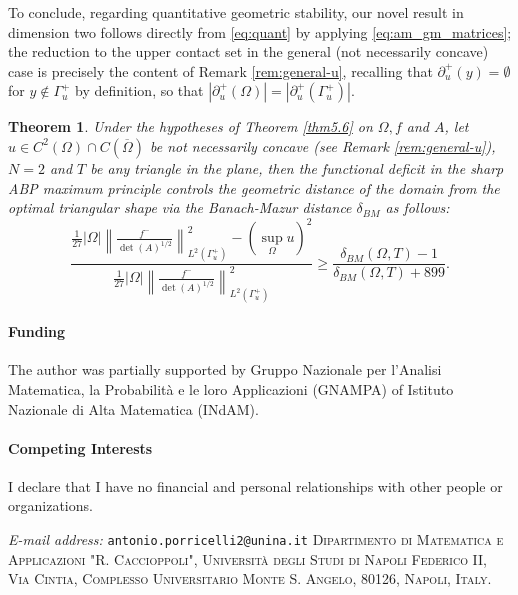 \documentclass{article}
\newtheorem{theorem}{Theorem}[section]
\numberwithin{equation}{section}
\begin{document}
\noindent To conclude, regarding quantitative geometric stability, our novel result in dimension two follows directly from \eqref{eq:quant} by applying \eqref{eq:am_gm_matrices}; the reduction to the upper contact set in the general (not necessarily concave) case is precisely the content of Remark \ref{rem:general-u}, recalling that $\partial^+_u(y)=\emptyset$ for $y\notin\Gamma_u^+$ by definition, so that $|\partial^+_u(\Omega)|=|\partial^+_u(\Gamma^+_u)|$.
\begin{theorem}\label{thm:final-stability}
Under the hypotheses of Theorem \ref{thm5.6} on $\Omega, f$ and $A$, let $u\in C^2(\Omega)\cap C(\overline\Omega)$ be not necessarily concave (see Remark \ref{rem:general-u}), $N=2$ and $T$ be any triangle in the plane, then the functional deficit in the sharp ABP maximum principle controls the geometric distance of the domain from the optimal triangular shape via the Banach-Mazur distance $\delta_{BM}$ as follows:
\begin{equation}
\frac{\frac{1}{27}|\Omega|\left\|\frac{f^-}{\det(A)^{1/2}}\right\|^2_{L^2(\Gamma^+_u)} - (\sup_\Omega u)^2}{\frac{1}{27}|\Omega|\left\|\frac{f^-}{\det(A)^{1/2}}\right\|^2_{L^2(\Gamma^+_u)}} \ge \frac{\delta_{BM}(\Omega, T)-1}{\delta_{BM}(\Omega,T)+899}.
\end{equation}
\end{theorem}

\paragraph{Funding}
The author was partially supported by Gruppo Nazionale per l’Analisi Matematica, la Probabilità e le loro Applicazioni
(GNAMPA) of Istituto Nazionale di Alta Matematica (INdAM).

\paragraph{Competing Interests}
I declare that I have no financial and personal relationships with other people or organizations.
\newpage

\nocite{*}
 

\bigskip
\textit{E-mail address: } 
\texttt{antonio.porricelli2@unina.it}
\newline
\textsc{Dipartimento di Matematica e Applicazioni "R. Caccioppoli", Università degli Studi di Napoli Federico II, Via Cintia, Complesso Universitario Monte S. Angelo, 80126, Napoli, Italy.}
\end{document}

